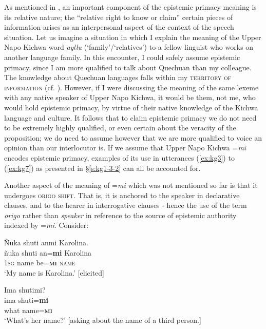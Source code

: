 \documentclass[output=paper]{langscibook}
\begin{document}
As mentioned in , an important component of the epistemic primacy meaning is its relative nature; the “relative right to know or claim” certain pieces of information arises as an interpersonal aspect of the context of the speech situation. Let us imagine a situation in which I explain the meaning of the Upper Napo Kichwa word \textit{ayllu} (‘family’/‘relatives’) to a fellow linguist who works on another language family. In this encounter, I could safely assume epistemic primacy, since I am more qualified to talk about Quechuan than my colleague. The knowledge about Quechuan languages falls within my \textsc{territory of information} (cf. \citealt{Kamio1997}). However, if I were discussing the meaning of the same lexeme with any native speaker of Upper Napo Kichwa, it would be them, not me, who would hold epistemic primacy, by virtue of their native knowledge of the Kichwa language and culture. It follows that to claim epistemic primacy we do not need to be extremely highly qualified, or even certain about the veracity of the proposition; we do need to assume however that we are more qualified to voice an opinion than our interlocutor is. If we assume that Upper Napo Kichwa =\textit{mi} encodes epistemic primacy, examples of its use in utterances ‎(\ref{ex:kg3}) to ‎(\ref{ex:kg7}) as presented in §‎\ref{s:kg1-3-2} can all be accounted for.

Another aspect of the meaning of =\textit{mi} which was not mentioned so far is that it undergoes \textsc{origo shift}. That is, it is anchored to the speaker in declarative clauses, and to the hearer in interrogative clauses - hence the use of the term \emph{origo} rather than \emph{speaker} in reference to the source of epistemic authority indexed by =\textit{mi}.  Consider:

\begin{exe}
	\ex \label{ex:kg11}
	\glll Ñuka shuti anmi Karolina.\\
	ñuka shuti an=\textbf{mi} Karolina\\
	1\textsc{sg}	 name be=\textbf{\textsc{mi}} \textsc{name}\\
	\trans ‘My name is Karolina.’ [elicited]
\end{exe}

\begin{exe}
	\ex \label{ex:kg12}
	\glll Ima shutimi?\\
	ima	shuti=\textbf{mi}\\
	what	 name=\textbf{\textsc{mi}}\\
	\trans ‘What’s her name?’ [asking about the name of a third person.] \newline [in\_20092013\_03   216]
\end{exe}
\end{document}

